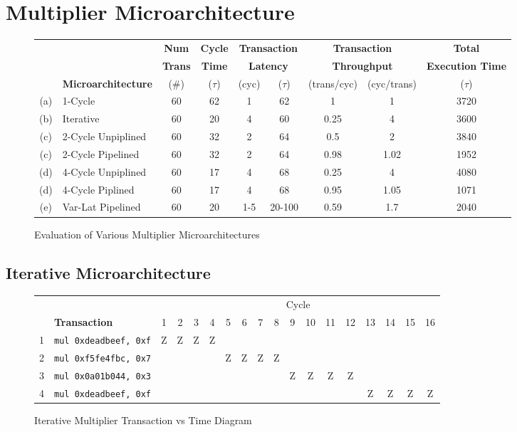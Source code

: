 \documentclass[10pt]{article}
\begin{document}
\cleardoublepage
\section{Multiplier Microarchitecture}
\begin{figure}[H]
\centering
{\setlength{\tabcolsep}{2pt}
\begin{tabular}{@{\extracolsep{3pt}}clccccccc@{}}
\hline
& & \textbf{Num} & \textbf{Cycle} & \multicolumn{2}{c}{\textbf{Transaction}} & \multicolumn{2}{c}{\textbf{Transaction}} & \textbf{Total} \\
& & \textbf{Trans} &  \textbf{Time} & \multicolumn{2}{c}{\textbf{Latency}} & \multicolumn{2}{c}{\textbf{Throughput}} & \textbf{Execution Time} \\
\cline{3-3} 
\cline{4-4}
\cline{5-6}
\cline{7-8}
\cline{9-9}
& \textbf{Microarchitecture} & (\#) & ($\tau$) & (cyc) & ($\tau$) & (trans/cyc) & (cyc/trans) & ($\tau$) \\
\hline
(a) & 1-Cycle & 60 & 62 & 1 & 62 & 1 & 1 & 3720\\
\hline
(b) & Iterative & 60 & 20 & 4 & 60 & 0.25 & 4 & 3600\\
\hline
(c) & 2-Cycle Unpiplined & 60 & 32 & 2 & 64 & 0.5 & 2 & 3840\\
\hline
(c) & 2-Cycle Pipelined & 60 & 32 & 2 & 64 & 0.98 & 1.02 & 1952\\
\hline
(d) & 4-Cycle Unpiplined & 60 & 17 & 4 & 68 & 0.25 & 4 & 4080\\
\hline
(d) & 4-Cycle Piplined & 60 & 17 & 4 & 68 & 0.95 & 1.05 & 1071\\
\hline
(e) & Var-Lat Pipelined & 60 & 20 & 1-5 & 20-100 & 0.59 & 1.7 & 2040\\
\hline
\end{tabular}
}
\caption{Evaluation of Various Multiplier Microarchitectures}
\label{fig:mult_arch}
\end{figure}

\subsection{Iterative Microarchitecture}
\begin{figure}[H]
\centering
\begin{tabular}{cl|c|c|c|c|c|c|c|c|c|c|c|c|c|c|c|c}
\hline
& & \multicolumn{16}{c}{Cycle} \\
& \textbf{Transaction} & 1 & 2 & 3 & 4 & 5 & 6 & 7 & 8 & 9 & 10 & 11 & 12 & 13 & 14 & 15 & 16\\
\hline
1 & \texttt{mul 0xdeadbeef, 0xf} & Z & Z & Z & Z & & & & & & & & & & & &\\
\hline
2 & \texttt{mul 0xf5fe4fbc, 0x7} & & & & & Z & Z & Z & Z & & & & & & & &\\
\hline
3 & \texttt{mul 0x0a01b044, 0x3} & & & & & & & & & Z & Z & Z & Z & & & &\\
\hline
4 & \texttt{mul 0xdeadbeef, 0xf} & & & & & & & & & & & & & Z & Z & Z & Z\\
\hline
\end{tabular}
\caption{Iterative Multiplier Transaction vs Time Diagram}
\label{fig:iter_trans_diagram}
\end{figure}
\end{document}

